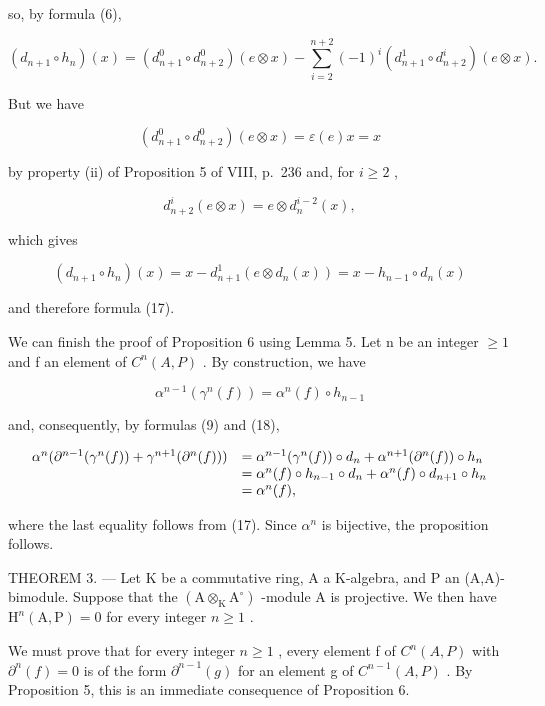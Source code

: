 so, by formula (6),

\[
(d _ {n + 1} \circ h _ {n}) (x) = (d _ {n + 1} ^ {0} \circ d _ {n + 2} ^ {0}) (e \otimes x) - \sum_ {i = 2} ^ {n + 2} (- 1) ^ {i} (d _ {n + 1} ^ {1} \circ d _ {n + 2} ^ {i}) (e \otimes x).
\]

But we have

\[
(d _ {n + 1} ^ {0} \circ d _ {n + 2} ^ {0}) (e \otimes x) = \varepsilon (e) x = x
\]

by property (ii) of Proposition 5 of VIII, p.~236 and, for \(i \geqslant 2\) ,

\[
d _ {n + 2} ^ {i} (e \otimes x) = e \otimes d _ {n} ^ {i - 2} (x),
\]

which gives

\[
(d _ {n + 1} \circ h _ {n}) (x) = x - d _ {n + 1} ^ {1} (e \otimes d _ {n} (x)) = x - h _ {n - 1} \circ d _ {n} (x)
\]

and therefore formula (17).

We can finish the proof of Proposition 6 using Lemma 5. Let n be an integer \(\geqslant 1\) and f an element of \(C^{n}(A,P)\) . By construction, we have

\[
\alpha^ {n - 1} (\gamma^ {n} (f)) = \alpha^ {n} (f) \circ h _ {n - 1}\tag{18}
\]

and, consequently, by formulas (9) and (18),

\[
\begin{array}{r l} \alpha^ {n} (\partial^ {n - 1} (\gamma^ {n} (f)) + \gamma^ {n + 1} (\partial^ {n} (f))) & = \alpha^ {n - 1} (\gamma^ {n} (f)) \circ d _ {n} + \alpha^ {n + 1} (\partial^ {n} (f)) \circ h _ {n} \\ & = \alpha^ {n} (f) \circ h _ {n - 1} \circ d _ {n} + \alpha^ {n} (f) \circ d _ {n + 1} \circ h _ {n} \\ & = \alpha^ {n} (f), \end{array}
\]

where the last equality follows from (17). Since \(\alpha^{n}\) is bijective, the proposition follows.

THEOREM 3. --- Let K be a commutative ring, A a K-algebra, and P an (A,A)-bimodule. Suppose that the \((\mathrm{A}\otimes_{\mathrm{K}}\mathrm{A}^{\circ})\) -module A is projective. We then have \(\mathrm{H}^{n}(\mathrm{A},\mathrm{P})=0\) for every integer \(n\geqslant1\) .

We must prove that for every integer \(n \geqslant 1\) , every element f of \(C^{n}(A, P)\) with \(\partial^{n}(f) = 0\) is of the form \(\partial^{n-1}(g)\) for an element g of \(C^{n-1}(A, P)\) . By Proposition 5, this is an immediate consequence of Proposition 6.


